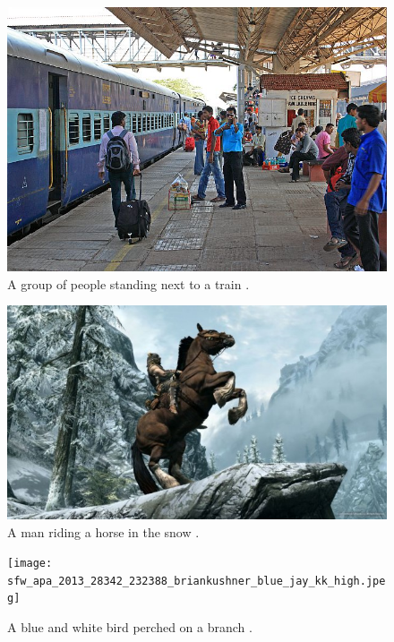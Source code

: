 \documentclass[11pt]{article}
\begin{document}
\begin{figure}[ht!]
			    	\centering
					\includegraphics[scale=0.266]{margao_railwaystation_1441973309.jpg}
					\caption{A group of people standing next to a train .\label{fig11}}
\end{figure}
\begin{figure}[ht!]
			    	\centering
					\includegraphics[scale=0.266]{skyrim_Horse01-625x352.jpg}
					\caption{A man riding a horse in the snow .\label{fig12}}
\end{figure}
\begin{figure}[ht!]
			    	\centering
					\texttt{[image: sfw\_apa\_2013\_28342\_232388\_briankushner\_blue\_jay\_kk\_high.jpeg]}
					\caption{A blue and white bird perched on a branch .\label{fig13}}
\end{figure}
\end{document}
